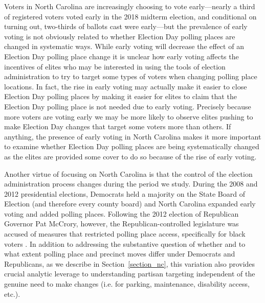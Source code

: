 \documentclass[12pt]{article}
\begin{document}
Voters in North Carolina are increasingly choosing to vote early---nearly a third of registered voters voted early in the 2018 midterm election, and conditional on turning out, two-thirds of ballots cast were early---but the prevalence of early voting is not obviously related to whether Election Day polling places are changed in systematic ways. While early voting will decrease the effect of an Election Day polling place change it is unclear how early voting affects the incentives of elites who may be interested in using the tools of election administration to try to target some types of voters when changing polling place locations.  In fact, the rise in early voting may actually make it easier to close Election Day polling places by making it easier for elites to claim that the Election Day polling place is not needed due to early voting. Precisely because more voters are voting early we may be more likely to observe elites pushing to make Election Day changes that target some voters more than others. If anything, the presence of early voting in North Carolina makes it more important to examine whether Election Day polling places are being systematically changed as the elites are provided some cover to do so because of the rise of early voting.

Another virtue of focusing on North Carolina is that the control of the election administration process changes during the period we study. During the 2008 and 2012 presidential elections, Democrats held a majority on the State Board of Election (and therefore every county board) and North Carolina expanded early voting and added polling places. Following the 2012 election of Republican Governor Pat McCrory, however, the Republican-controlled legislature was accused of measures that restricted polling place access, specifically for black voters \citep{campbell2016,newkirkAtlantic}.  In addition to addressing the substantive question of whether and to what extent polling place and precinct moves differ under Democrats and Republicans, as we describe in Section~\ref{section_nc}, this variation also provides crucial analytic leverage to understanding partisan targeting independent of the genuine need to make changes (i.e. for parking, maintenance, disability access, etc.).
\end{document}
